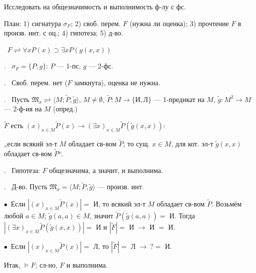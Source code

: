 
\newcommand{\nm}[1]{\par\hangindent=7mm\hangafter=1\noindent #1\ }
\newcommand{\nbul}[1]{\par\hangindent=7mm\hangafter=1\noindent\hspace*{4mm}$\bullet$\ #1}
\newcommand{\tP}{\tilde P}\newcommand{\tg}{\tilde g}\newcommand{\tf}{\tilde f}\newcommand{\tF}{\tilde F}
\newcommand{\cm}{_{x\in M}}
\newcommand{\eq}[2]{\par\noindent\hspace*{6mm}$\equiv #1$\par\nopagebreak\noindent\hfill{\color{ink!75}\nb{#2}}\hspace*{4mm}}
\shapka
{}\par
{}\par\vspace{2mm}
 Исследовать на общезначимость и выполнимость ф-лу с фс.\par
План: 1) сигнатура $\sigma_F$; 2) своб. перем. $F$ (нужна ли оценка); 3) прочтение $F$ в произв. инт. с оц.; 4) гипотеза; 5) д-во.\par\vspace{2mm}
\ $F\rightleftharpoons\forall xP(x)\supset\exists xP(g(x,x))$
\nm{1.} $\sigma_F=\{P;g\}$: $P$ --- 1-пс, $g$ --- 2-фс.
\nm{2.} Своб. перем. нет ($F$ замкнута), оценка не нужна.
\nm{3.} Пусть $\mathfrak M_\sigma\rightleftharpoons\langle M;\tP,\tg\rangle$, $M\neq\emptyset$, $\tP\colon M\to\{\text{И},\text{Л}\}$ --- 1-предикат на $M$, $\tg\colon M^2\to M$ --- 2-ф-ия на $M$ (опред.)\par
\hspace*{10mm}$\tF$ есть $(x)\cm\tP(x)\to(\exists x)\cm\tP(\tg(x,x))$:\par
„если всякий эл-т $M$ обладает св-вом $\tP$, то сущ. $x\in M$, для кот. эл-т $\tg(x,x)$ обладает св-вом $\tP$“.
\nm{4.} Гипотеза: $F$ общезначима, а значит, и выполнима.
\nm{5.} Д-во. Пусть $\mathfrak M_\sigma=\langle M;\tP,\tg\rangle$ --- произв. инт.
\nbul{Если $|(x)\cm\tP(x)|=$ И, то всякий эл-т $M$ обладает св-вом $\tP$. Возьмём любой $a\in M$; $\tg(a,a)\in M$, значит $\tP(\tg(a,a))=$ И. Тогда $|(\exists x)\cm\tP(\tg(x,x))|=$ И и $|\tF|=$ И $\to$ И $=$ И.}
\nbul{Если $|(x)\cm\tP(x)|=$ Л, то $|\tF|=$ Л $\to\ ?=$ И.}\par
Итак, $\models F$; сл-но, $F$ и выполнима.\par\vspace{3mm}
